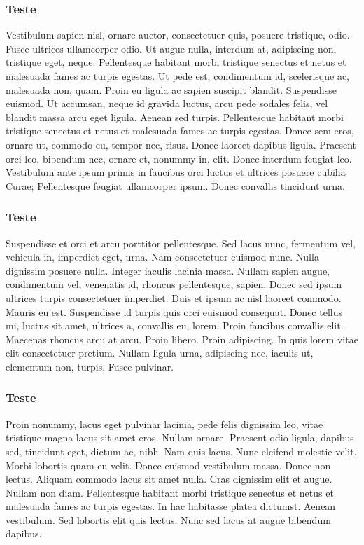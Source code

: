 \subsubsection{Teste}
Vestibulum sapien nisl, ornare auctor, consectetuer quis, posuere tristique, odio. Fusce ultrices ullamcorper odio. Ut augue nulla, interdum at, adipiscing non, tristique eget, neque. Pellentesque habitant morbi tristique senectus et netus et malesuada fames ac turpis egestas. Ut pede est, condimentum id, scelerisque ac, malesuada non, quam. Proin eu ligula ac sapien suscipit blandit. Suspendisse euismod. Ut accumsan, neque id gravida luctus, arcu pede sodales felis, vel blandit massa arcu eget ligula. Aenean sed turpis. Pellentesque habitant morbi tristique senectus et netus et malesuada fames ac turpis egestas. Donec sem eros, ornare ut, commodo eu, tempor nec, risus. Donec laoreet dapibus ligula. Praesent orci leo, bibendum nec, ornare et, nonummy in, elit. Donec interdum feugiat leo. Vestibulum ante ipsum primis in faucibus orci luctus et ultrices posuere cubilia Curae; Pellentesque feugiat ullamcorper ipsum. Donec convallis tincidunt urna.
\subsubsection{Teste}
Suspendisse et orci et arcu porttitor pellentesque. Sed lacus nunc, fermentum vel, vehicula in, imperdiet eget, urna. Nam consectetuer euismod nunc. Nulla dignissim posuere nulla. Integer iaculis lacinia massa. Nullam sapien augue, condimentum vel, venenatis id, rhoncus pellentesque, sapien. Donec sed ipsum ultrices turpis consectetuer imperdiet. Duis et ipsum ac nisl laoreet commodo. Mauris eu est. Suspendisse id turpis quis orci euismod consequat. Donec tellus mi, luctus sit amet, ultrices a, convallis eu, lorem. Proin faucibus convallis elit. Maecenas rhoncus arcu at arcu. Proin libero. Proin adipiscing. In quis lorem vitae elit consectetuer pretium. Nullam ligula urna, adipiscing nec, iaculis ut, elementum non, turpis. Fusce pulvinar.

\subsubsection{Teste}
Proin nonummy, lacus eget pulvinar lacinia, pede felis dignissim leo, vitae tristique magna lacus sit amet eros. Nullam ornare. Praesent odio ligula, dapibus sed, tincidunt eget, dictum ac, nibh. Nam quis lacus. Nunc eleifend molestie velit. Morbi lobortis quam eu velit. Donec euismod vestibulum massa. Donec non lectus. Aliquam commodo lacus sit amet nulla. Cras dignissim elit et augue. Nullam non diam. Pellentesque habitant morbi tristique senectus et netus et malesuada fames ac turpis egestas. In hac habitasse platea dictumst. Aenean vestibulum. Sed lobortis elit quis lectus. Nunc sed lacus at augue bibendum dapibus.

